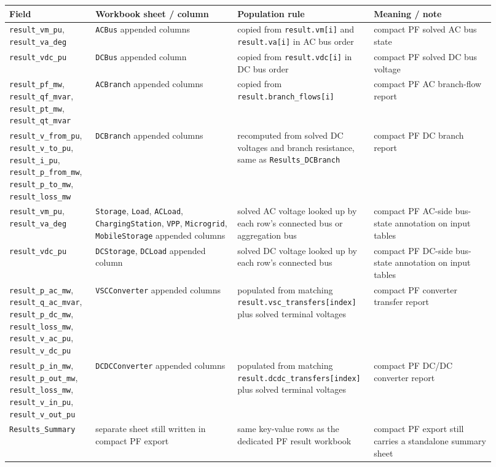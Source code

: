 \begin{longtable}{@{}L{0.17\linewidth}L{0.29\linewidth}L{0.22\linewidth}L{0.24\linewidth}@{}}
\toprule
Field & Workbook sheet / column & Population rule & Meaning / note \\
\midrule
\endhead
\texttt{result\_vm\_pu}, \texttt{result\_va\_deg} & \texttt{ACBus} appended columns & copied from \texttt{result.vm[i]} and \texttt{result.va[i]} in AC bus order & compact PF solved AC bus state \\
\texttt{result\_vdc\_pu} & \texttt{DCBus} appended column & copied from \texttt{result.vdc[i]} in DC bus order & compact PF solved DC bus voltage \\
\texttt{result\_pf\_mw}, \texttt{result\_qf\_mvar}, \texttt{result\_pt\_mw}, \texttt{result\_qt\_mvar} & \texttt{ACBranch} appended columns & copied from \texttt{result.branch\_flows[i]} & compact PF AC branch-flow report \\
\texttt{result\_v\_from\_pu}, \texttt{result\_v\_to\_pu}, \texttt{result\_i\_pu}, \texttt{result\_p\_from\_mw}, \texttt{result\_p\_to\_mw}, \texttt{result\_loss\_mw} & \texttt{DCBranch} appended columns & recomputed from solved DC voltages and branch resistance, same as \texttt{Results\_DCBranch} & compact PF DC branch report \\
\texttt{result\_vm\_pu}, \texttt{result\_va\_deg} & \texttt{Storage}, \texttt{Load}, \texttt{ACLoad}, \texttt{ChargingStation}, \texttt{VPP}, \texttt{Microgrid}, \texttt{MobileStorage} appended columns & solved AC voltage looked up by each row's connected bus or aggregation bus & compact PF AC-side bus-state annotation on input tables \\
\texttt{result\_vdc\_pu} & \texttt{DCStorage}, \texttt{DCLoad} appended column & solved DC voltage looked up by each row's connected bus & compact PF DC-side bus-state annotation on input tables \\
\texttt{result\_p\_ac\_mw}, \texttt{result\_q\_ac\_mvar}, \texttt{result\_p\_dc\_mw}, \texttt{result\_loss\_mw}, \texttt{result\_v\_ac\_pu}, \texttt{result\_v\_dc\_pu} & \texttt{VSCConverter} appended columns & populated from matching \texttt{result.vsc\_transfers[index]} plus solved terminal voltages & compact PF converter transfer report \\
\texttt{result\_p\_in\_mw}, \texttt{result\_p\_out\_mw}, \texttt{result\_loss\_mw}, \texttt{result\_v\_in\_pu}, \texttt{result\_v\_out\_pu} & \texttt{DCDCConverter} appended columns & populated from matching \texttt{result.dcdc\_transfers[index]} plus solved terminal voltages & compact PF DC/DC converter report \\
\texttt{Results\_Summary} & separate sheet still written in compact PF export & same key-value rows as the dedicated PF result workbook & compact PF export still carries a standalone summary sheet \\
\bottomrule
\end{longtable}

